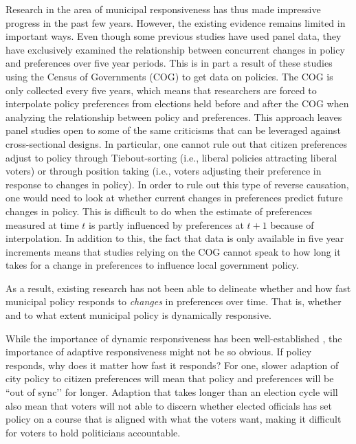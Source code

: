 \documentclass[a4paper,12pt]{article}
\begin{document}
 
Research in the area of municipal responsiveness has thus made impressive progress in the past few years. However, the existing evidence remains limited in important ways. Even though some previous studies have used panel data, they have exclusively examined  the relationship between concurrent changes in policy and preferences over five year periods.  This is in part a result of these studies using the Census of  Governments (COG) to get data on policies. The COG is only collected every five years, which means that researchers are forced to interpolate policy preferences from elections held before and after the COG when analyzing the relationship between policy and preferences. This approach leaves panel studies open to some of the same criticisms that can be leveraged against cross-sectional designs. In particular, one cannot rule out that citizen preferences adjust to policy through Tiebout-sorting (i.e., liberal policies attracting liberal voters) or through position taking  (i.e., voters adjusting their preference in response to changes in policy). In order to rule out this type of reverse causation, one would need to look at whether current changes in preferences predict future changes in policy. This is difficult to do when the estimate of preferences measured at time $t$ is partly influenced by preferences at $t+1$ because of interpolation. In addition to this, the fact that data is only available in five year increments means that studies relying on the COG cannot speak to how long it takes for a change in preferences to influence local government policy. 


As a result, existing research has not been able to delineate whether and how fast municipal policy responds to \textit{changes} in preferences over time. That is, whether and to what extent municipal policy is dynamically responsive. 

While the importance of dynamic responsiveness has been well-established \citep{stimson1995dynamic}, the importance of adaptive responsiveness might not be so obvious. If policy responds, why does it matter how fast it responds? For one, slower adaption of city policy to citizen preferences will mean that policy and preferences will be ``out of sync’’ for longer. Adaption that takes longer than an election cycle will also mean that voters will not able to discern whether elected officials has set policy on a course that is aligned with what the voters want, making it difficult for voters to hold politicians accountable.
\end{document}
